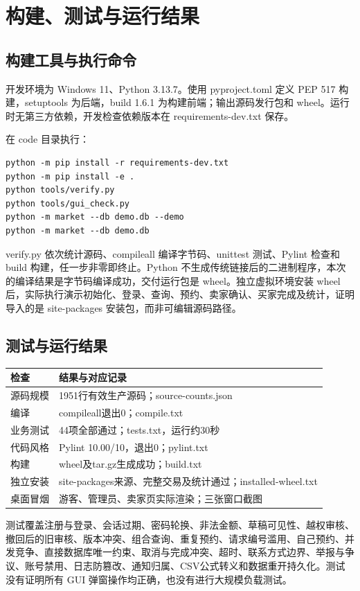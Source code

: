 \documentclass[11pt,a4paper]{ctexart}
\begin{document}
\section{构建、测试与运行结果}
\subsection{构建工具与执行命令}
开发环境为 Windows 11、Python 3.13.7。使用 pyproject.toml 定义 PEP 517 构建，setuptools 为后端，build 1.6.1 为构建前端；输出源码发行包和 wheel。运行时无第三方依赖，开发检查依赖版本在 requirements-dev.txt 保存。

在 code 目录执行：
\begin{verbatim}
python -m pip install -r requirements-dev.txt
python -m pip install -e .
python tools/verify.py
python tools/gui_check.py
python -m market --db demo.db --demo
python -m market --db demo.db
\end{verbatim}

verify.py 依次统计源码、compileall 编译字节码、unittest 测试、Pylint 检查和 build 构建，任一步非零即终止。Python 不生成传统链接后的二进制程序，本次的编译结果是字节码编译成功，交付运行包是 wheel。独立虚拟环境安装 wheel 后，实际执行演示初始化、登录、查询、预约、卖家确认、买家完成及统计，证明导入的是 site-packages 安装包，而非可编辑源码路径。

\subsection{测试与运行结果}
\begin{tabularx}{\textwidth}{p{}Y}
\toprule 检查 & 结果与对应记录\\\midrule
源码规模 & 1951行有效生产源码；source-counts.json\\
编译 & compileall退出0；compile.txt\\
业务测试 & 44项全部通过；tests.txt，运行约30秒\\
代码风格 & Pylint 10.00/10，退出0；pylint.txt\\
构建 & wheel及tar.gz生成成功；build.txt\\
独立安装 & site-packages来源、完整交易及统计通过；installed-wheel.txt\\
桌面冒烟 & 游客、管理员、卖家页实际渲染；三张窗口截图\\
\bottomrule
\end{tabularx}

测试覆盖注册与登录、会话过期、密码轮换、非法金额、草稿可见性、越权审核、撤回后的旧审核、版本冲突、组合查询、重复预约、请求编号滥用、自己预约、并发竞争、直接数据库唯一约束、取消与完成冲突、超时、联系方式边界、举报与争议、账号禁用、日志防篡改、通知归属、CSV公式转义和数据重开持久化。测试没有证明所有 GUI 弹窗操作均正确，也没有进行大规模负载测试。
\end{document}
